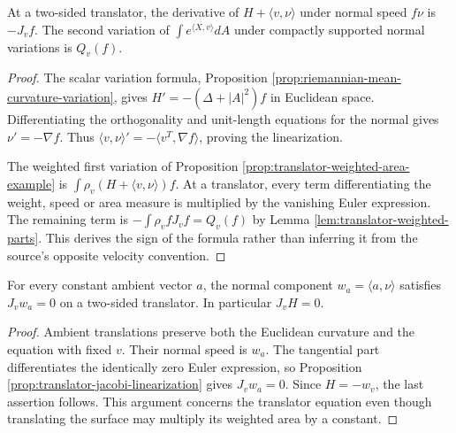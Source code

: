 \begin{proposition}\label{prop:translator-jacobi-linearization}
At a two-sided translator, the derivative of $H+\langle v,\nu\rangle$ under normal speed $f\nu$ is $-J_vf$. The second variation of $\int e^{\langle X,v\rangle}dA$ under compactly supported normal variations is $Q_v(f)$.
\end{proposition}
\begin{proof}
The scalar variation formula, Proposition \ref{prop:riemannian-mean-curvature-variation}, gives $H'=-(\Delta+|A|^2)f$ in Euclidean space. Differentiating the orthogonality and unit-length equations for the normal gives $\nu'=-\nabla f$. Thus $\langle v,\nu\rangle'=-\langle v^T,\nabla f\rangle$, proving the linearization.

The weighted first variation of Proposition \ref{prop:translator-weighted-area-example} is $\int\rho_v(H+\langle v,\nu\rangle)f$. At a translator, every term differentiating the weight, speed or area measure is multiplied by the vanishing Euler expression. The remaining term is $-\int\rho_vfJ_vf=Q_v(f)$ by Lemma \ref{lem:translator-weighted-parts}. This derives the sign of the formula rather than inferring it from the source's opposite velocity convention.
\end{proof}

\begin{proposition}\label{prop:translator-angle-jacobi}
For every constant ambient vector $a$, the normal component $w_a=\langle a,\nu\rangle$ satisfies $J_vw_a=0$ on a two-sided translator. In particular $J_vH=0$.
\end{proposition}
\begin{proof}
Ambient translations preserve both the Euclidean curvature and the equation with fixed $v$. Their normal speed is $w_a$. The tangential part differentiates the identically zero Euler expression, so Proposition \ref{prop:translator-jacobi-linearization} gives $J_vw_a=0$. Since $H=-w_v$, the last assertion follows. This argument concerns the translator equation even though translating the surface may multiply its weighted area by a constant.
\end{proof}

